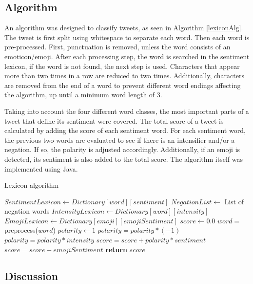 \subsection{Algorithm}

An algorithm was designed to classify tweets, as seen in Algorithm \ref{lexiconAlg}. The tweet is first split using whitespace to separate each word. Then each word is pre-processed. First, punctuation is removed, unless the word consists of an emoticon/emoji. After each processing step, the word is searched in the sentiment lexicon, if the word is not found, the next step is used. Characters that appear more than two times in a row are reduced to two times. Additionally, characters are removed from the end of a word to prevent different word endings affecting the algorithm, up until a minimum word length of 3.

Taking into account the four different word classes, the most important parts of a tweet that define its sentiment were covered. The total score of a tweet is calculated by adding the score of each sentiment word. For each sentiment word, the previous two words are evaluated to see if there is an intensifier and/or a negation. If so, the polarity is adjusted accordingly. Additionally, if an emoji is detected, its sentiment is also added to the total score. The algorithm itself was implemented using Java.

\begin{algorithm}[]
  \caption{Lexicon algorithm}\label{lexiconAlg}
    \begin{algorithmic}[1]
            \State $SentimentLexicon \gets Dictionary[word][sentiment]$
            \State $NegationList \gets$ List of negation words
            \State $IntensityLexicon \gets Dictionary[word][intensity]$
            \State $EmojiLexicon \gets Dictionary[emoji][emojiSentiment]$ 
            \State $score \gets 0.0$
                \State $word =$ preprocess($word$)
                    \State $polarity \gets 1$
                            \State $polarity = polarity * (-1)$
                        \Else
                                \State $polarity = polarity * intensity$
                            \EndIf
                        \EndIf
                    \EndFor
                    \State $score = score + polarity * sentiment$
                \Else
                        \State $score = score + emojiSentiment$
                    \EndIf
                \EndIf 
            \EndFor
            \State \textbf{return} $score$
        \EndFunction
    \end{algorithmic}
\end{algorithm}

\subsection{Discussion}
